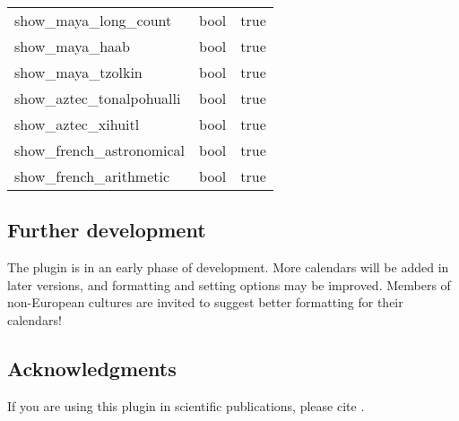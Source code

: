 \begin{longtable}{l|l|l}
show\_maya\_long\_count      &bool & true\\
show\_maya\_haab             &bool & true\\
show\_maya\_tzolkin          &bool & true\\
show\_aztec\_tonalpohualli   &bool & true\\
show\_aztec\_xihuitl         &bool & true\\\midrule
show\_french\_astronomical   &bool & true\\
show\_french\_arithmetic     &bool & true\\\bottomrule
\end{longtable}

\subsection{Further development}
The plugin is in an early phase of development. More calendars will be
added in later versions, and formatting and setting options may be
improved. Members of non-European cultures are invited to suggest
better formatting for their calendars!

\subsection{Acknowledgments}

If you are using this plugin in scientific publications, please cite \citet{Zotti-etal:JSA2020.6.2}.



